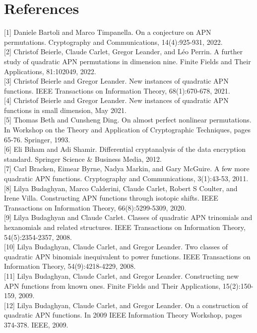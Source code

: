 \documentclass[10pt]{article}
\begin{document}
\section*{References}
[1] Daniele Bartoli and Marco Timpanella. On a conjecture on APN permutations. Cryptography and Communications, 14(4):925-931, 2022.\\[0pt]
[2] Christof Beierle, Claude Carlet, Gregor Leander, and Léo Perrin. A further study of quadratic APN permutations in dimension nine. Finite Fields and Their Applications, 81:102049, 2022.\\[0pt]
[3] Christof Beierle and Gregor Leander. New instances of quadratic APN functions. IEEE Transactions on Information Theory, 68(1):670-678, 2021.\\[0pt]
[4] Christof Beierle and Gregor Leander. New instances of quadratic APN functions in small dimension, May 2021.\\[0pt]
[5] Thomas Beth and Cunsheng Ding. On almost perfect nonlinear permutations. In Workshop on the Theory and Application of Cryptographic Techniques, pages 65-76. Springer, 1993.\\[0pt]
[6] Eli Biham and Adi Shamir. Differential cryptanalysis of the data encryption standard. Springer Science \& Business Media, 2012.\\[0pt]
[7] Carl Bracken, Eimear Byrne, Nadya Markin, and Gary McGuire. A few more quadratic APN functions. Cryptography and Communications, 3(1):43-53, 2011.\\[0pt]
[8] Lilya Budaghyan, Marco Calderini, Claude Carlet, Robert S Coulter, and Irene Villa. Constructing APN functions through isotopic shifts. IEEE Transactions on Information Theory, 66(8):5299-5309, 2020.\\[0pt]
[9] Lilya Budaghyan and Claude Carlet. Classes of quadratic APN trinomials and hexanomials and related structures. IEEE Transactions on Information Theory, 54(5):2354-2357, 2008.\\[0pt]
[10] Lilya Budaghyan, Claude Carlet, and Gregor Leander. Two classes of quadratic APN binomials inequivalent to power functions. IEEE Transactions on Information Theory, 54(9):4218-4229, 2008.\\[0pt]
[11] Lilya Budaghyan, Claude Carlet, and Gregor Leander. Constructing new APN functions from known ones. Finite Fields and Their Applications, 15(2):150-159, 2009.\\[0pt]
[12] Lilya Budaghyan, Claude Carlet, and Gregor Leander. On a construction of quadratic APN functions. In 2009 IEEE Information Theory Workshop, pages 374-378. IEEE, 2009.\\[0pt]
\end{document}
